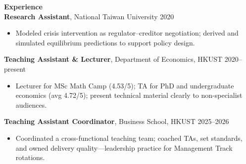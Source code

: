 \documentclass[11pt,letterpaper]{article}
\begin{document}
{\large \textbf{Experience}}\\[-0.5pt]
\textbf{Research Assistant}, National Taiwan University \hfill 2020\\
\vspace{-6pt}
\begin{itemize}
  \item Modeled crisis intervention as regulator--creditor negotiation; derived and simulated equilibrium predictions to support policy design.
\end{itemize}
\textbf{Teaching Assistant \& Lecturer}, Department of Economics, HKUST \hfill 2020--present\\
\vspace{-6pt}
\begin{itemize}
  \item Lecturer for MSc Math Camp (4.53/5); TA for PhD and undergraduate economics (avg 4.72/5); present technical material clearly to non-specialist audiences.
\end{itemize}
\textbf{Teaching Assistant Coordinator}, Business School, HKUST \hfill 2025--2026\\
\vspace{-6pt}
\begin{itemize}
  \item Coordinated a cross-functional teaching team; coached TAs, set standards, and owned delivery quality---leadership practice for Management Track rotations.
\end{itemize}

\vspace{0.15pt}
\end{document}
